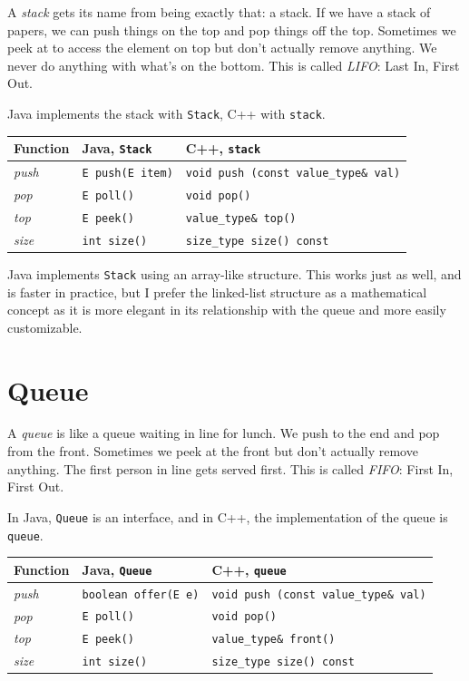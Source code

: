 A \textit{stack} gets its name from being exactly that: a stack. If we have a stack of papers, we can push things on the top and pop things off the top. Sometimes we peek at to access the element on top but don't actually remove anything. We never do anything with what's on the bottom. This is called \textit{LIFO}: Last In, First Out.

Java implements the stack with \texttt{Stack}, C++ with \texttt{stack}.

\begin{center}\begin{tabular}{ | p{5cm} | p{5cm} | p{5cm} | }
      \hline
      \textbf{Function}	&	\textbf{Java, \texttt{Stack}}	&	\textbf{C++, \texttt{stack}} \\ \hline
      \textit{push}		&	\texttt{E push(E item)}	&	\texttt{void push (const value\_type\& val)} \\ \hline
      \textit{pop}			&	\texttt{E poll()}		&	\texttt{void pop()}	\\ \hline
      \textit{top}		&	\texttt{E peek()}		&	\texttt{value\_type\& top()}	\\ \hline
      \textit{size} & \texttt{int size()} & \texttt{size\_type size() const} \\ \hline
\end{tabular}\end{center}

Java implements \texttt{Stack} using an array-like structure. This works just as well, and is faster in practice, but I prefer the linked-list structure as a mathematical concept as it is more elegant in its relationship with the queue and more easily customizable.

\section{Queue}

A \textit{queue} is like a queue waiting in line for lunch. We push to the end and pop from the front. Sometimes we peek at the front but don't actually remove anything. The first person in line gets served first. This is called \textit{FIFO}: First In, First Out.

In Java, \texttt{Queue} is an interface, and in C++, the implementation of the queue is \texttt{queue}.

\begin{center}\begin{tabular}{ | p{5cm} | p{5cm} | p{5cm} | }
    \hline
    \textbf{Function}	&	\textbf{Java, \texttt{Queue}}	&	\textbf{C++, \texttt{queue}} \\ \hline
    \textit{push}		&	\texttt{boolean offer(E e)}	&	\texttt{void push (const value\_type\& val)} \\ \hline
    \textit{pop}			&	\texttt{E poll()}		&	\texttt{void pop()}	\\ \hline
    \textit{top}		&	\texttt{E peek()}		&	\texttt{value\_type\& front()}	\\ \hline
    \textit{size} & \texttt{int size()} & \texttt{size\_type size() const} \\ \hline
	\end{tabular}\end{center}

